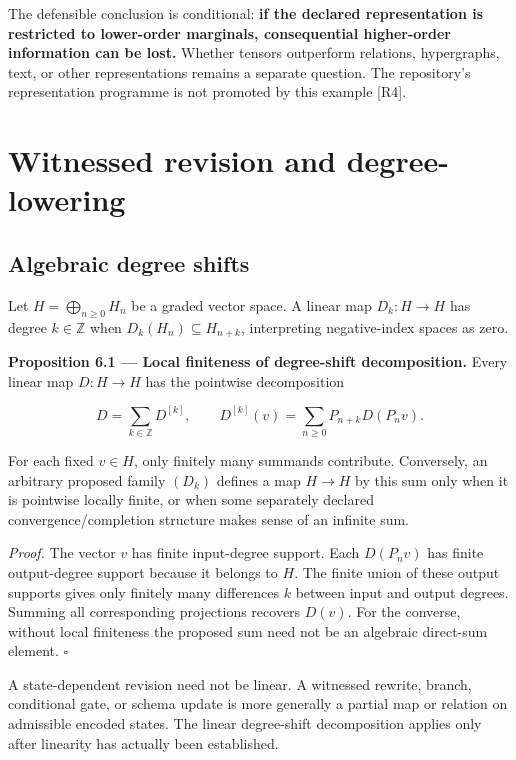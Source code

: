 \documentclass[11pt,a4paper]{article}
\begin{document}
The defensible conclusion is conditional: \textbf{if the declared
representation is restricted to lower-order marginals, consequential
higher-order information can be lost.} Whether tensors outperform
relations, hypergraphs, text, or other representations remains a
separate question. The repository's representation programme is not
promoted by this example {[}R4{]}.

\section{Witnessed revision and
degree-lowering}\label{witnessed-revision-and-degree-lowering}

\subsection{Algebraic degree shifts}\label{algebraic-degree-shifts}

Let \(H=\bigoplus_{n\geq0}H_n\) be a graded vector space. A linear map
\(D_k:H\to H\) has degree \(k\in\mathbb Z\) when
\(D_k(H_n)\subseteq H_{n+k}\), interpreting negative-index spaces as
zero.


\textbf{Proposition 6.1 --- Local finiteness of degree-shift
decomposition.} Every linear map \(D:H\to H\) has the pointwise
decomposition

\nopagebreak[4]

\[
D=\sum_{k\in\mathbb Z}D^{[k]},\qquad
D^{[k]}(v)=\sum_{n\geq0}P_{n+k}D(P_nv).
\]

For each fixed \(v\in H\), only finitely many summands contribute.
Conversely, an arbitrary proposed family \((D_k)\) defines a map
\(H\to H\) by this sum only when it is pointwise locally finite, or when
some separately declared convergence/completion structure makes sense of
an infinite sum.

\emph{Proof.} The vector \(v\) has finite input-degree support. Each
\(D(P_nv)\) has finite output-degree support because it belongs to
\(H\). The finite union of these output supports gives only finitely
many differences \(k\) between input and output degrees. Summing all
corresponding projections recovers \(D(v)\). For the converse, without
local finiteness the proposed sum need not be an algebraic direct-sum
element. \(\square\)

A state-dependent revision need not be linear. A witnessed rewrite,
branch, conditional gate, or schema update is more generally a partial
map or relation on admissible encoded states. The linear degree-shift
decomposition applies only after linearity has actually been
established.
\end{document}
